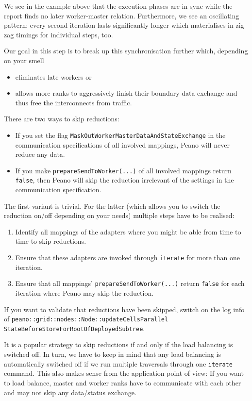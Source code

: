 \noindent
We see in the example above that the execution phases are in sync while the
report finds no later worker-master relation. 
Furthermore, we see an oscillating pattern: every second iteration lasts
significantly longer which materialises in zig zag timings for individual steps,
too.

Our goal in this step is to break up this synchronisation further which,
depending on your smell
\begin{itemize}
  \item eliminates late workers or
  \item allows more ranks to aggressively finish their boundary data exchange
  and thus free the interconnects from traffic.
\end{itemize}


\noindent
There are two ways to skip reductions:
\begin{itemize}
  \item If you set the flag \texttt{MaskOutWorkerMasterDataAndStateExchange}
  in the communication specifications of all involved mappings, Peano will never
  reduce any data.
  \item If you make \texttt{prepareSendToWorker(...)} of all involved mappings
  return \texttt{false}, then Peano will skip the reduction irrelevant of the
  settings in the communication specification.
\end{itemize}


\noindent
The first variant is trivial. For the latter (which allows you to switch the
reduction on/off depending on your needs) multiple steps have to be realised:


\begin{enumerate}
  \item Identify all mappings of the adapters where you might be able from time
  to time to skip reductions.
  \item Ensure that these adapters are invoked through \texttt{iterate} for more
  than one iteration.
  \item Ensure that all mappings' \texttt{prepareSendToWorker(...)} return
  \texttt{false} for each iteration where Peano may skip the reduction.
\end{enumerate}

  
\begin{remark}
  If you want to validate that reductions have been skipped, switch on the log
  info of 
  \texttt{peano::grid::nodes::Node::updateCellsParallel}
  \texttt{StateBeforeStoreForRootOfDeployedSubtree}.
\end{remark}

\noindent
It is a popular strategy to skip reductions if and only if the load balancing is
switched off.
In turn, we have to keep in mind that any load balancing is automatically
switched off if we run multiple traversals through one \texttt{iterate} command.
This also makes sense from the application point of view:
If you want to load balance, master and worker ranks have to communicate with
each other and may not skip any data/status exchange.
